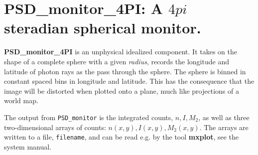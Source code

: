 \section{PSD\_monitor\_4PI: A $4 pi$ \si{steradian} spherical monitor.}

\textbf{PSD\_monitor\_4PI} is an unphysical idealized component. It takes on the shape of
a complete sphere with a given \textit{radius}, records the longitude and latitude of 
photon rays as the pass through the sphere.
The sphere is binned in constant spaced bins in longitude and latitude. This has the consequence
that the image will be distorted when plotted onto a plane, much like projections of a world map. 

The output from \texttt{PSD\_monitor} is the integrated counts, $n, I, M_2$,
as well as
three two-dimensional arrays of counts: $n(x,y), I(x,y), M_2(x,y)$.
The arrays are written to a file, \verb+filename+, and can be read e.g. by the tool
\textbf{mxplot}, see the system manual.

